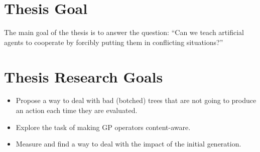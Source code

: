 \section{Thesis Goal}
The main goal of the thesis is to answer the question: ``Can we teach artificial agents to cooperate by forcibly putting them in conflicting situations?'' 
\section{Thesis Research Goals}
\begin{itemize}
    \item Propose a way to deal with bad (botched) trees that are not going to produce an action each time they are evaluated.
    \item Explore the task of making GP operators content-aware.
    
    \item Measure and find a way to deal with the impact of the initial generation.
\end{itemize}
